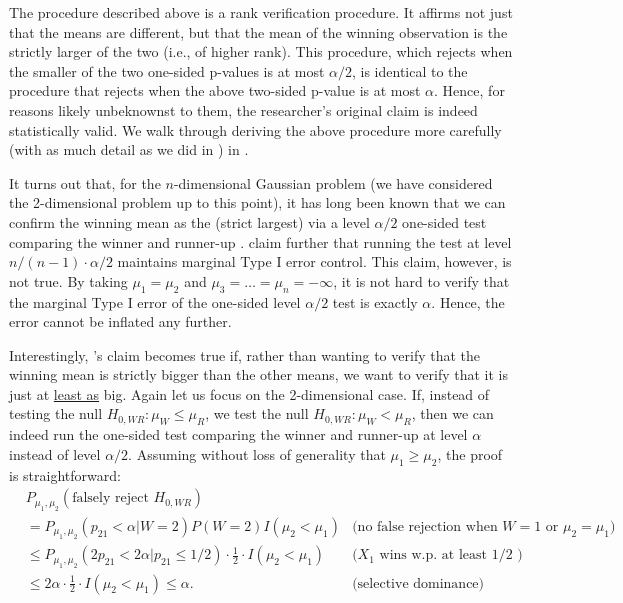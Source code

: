 \documentclass{article}
\begin{document}
The procedure described above is a rank verification procedure. It affirms not just that the means are different, but that the mean of the winning observation is the strictly larger of the two (i.e., of higher rank). This procedure, which rejects when the smaller of the two one-sided p-values is at most $\alpha/2$, is identical to the procedure that rejects when the above two-sided p-value is at most $\alpha$. Hence, for reasons likely unbeknownst to them, the researcher's original claim is indeed statistically valid. We walk through deriving the above procedure more carefully (with as much detail as we did in ) in .

It turns out that, for the $n$-dimensional Gaussian problem (we have considered the 2-dimensional problem up to this point), it has long been known that we can confirm the winning mean as the (strict largest) via a level $\alpha/2$ one-sided test comparing the winner and runner-up \citep{Gutmann}. \cite{Hung2019} claim further that running the test at level $n/(n-1) \cdot \alpha/2$ maintains marginal Type I error control. This claim, however, is not true. By taking $\mu_1 = \mu_2$ and $\mu_3 = \dots = \mu_n = -\infty$, it is not hard to verify that the marginal Type I error of the one-sided level $\alpha/2$ test is exactly $\alpha$. Hence, the error cannot be inflated any further.  

Interestingly, \cite{Hung2019}'s claim becomes true if, rather than wanting to verify that the winning mean is strictly bigger than the other means, we want to verify that it is just at \underline{least as} big. Again let us focus on the 2-dimensional case. If, instead of testing the null $H_{0, WR}: \mu_W \leq \mu_R$, we test the null $H_{0, WR} :\mu_W < \mu_R$, then we can indeed run the one-sided test comparing the winner and runner-up at level $\alpha$ instead of level $\alpha/2$. Assuming without loss of generality that $\mu_1 \geq \mu_2$, the proof is straightforward:
\begin{align*}
    &P_{\mu_1, \mu_2}(\text{falsely reject } H_{0, WR}) &\\
    & =P_{\mu_1, \mu_2}(p_{21} < \alpha | W = 2)P(W=2)I(\mu_2 < \mu_1) & \text{(no false rejection when $W=1$ or $\mu_2 =\mu_1$)}\\
    &\leq P_{\mu_1, \mu_2}(2p_{21} < 2\alpha | p_{21} \leq 1/2)\cdot \frac{1}{2} \cdot I(\mu_2 < \mu_1) & \text{($X_1$ wins w.p. at least $1/2$ )}\\
    &\leq 2 \alpha \cdot \frac{1}{2} \cdot I(\mu_2 < \mu_1) \leq \alpha. & \text{(selective dominance)}
\end{align*}
\end{document}
